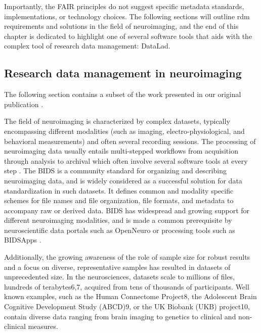 Importantly, the \gls{FAIR} principles do not suggest specific metadata standards, implementations, or technology choices.
The following sections will outline \gls{rdm} requirements and solutions in the field of neuroimaging, and the end of this chapter is dedicated to  highlight one of several software tools that aids with the complex tool of research data management: DataLad.

\subsection{Research data management in neuroimaging}
\label{chap:k1-rdm-2}

The following section contains a subset of the work presented in our original publication \citet{NISO2022119623}.

The field of neuroimaging is characterized by complex datasets, typically encompassing different modalities (such as imaging, electro-physiological, and behavioral measurements) and often several recording sessions.
The processing of neuroimaging data usually entails multi-stepped workflows from acquisition through analysis to archival which often involve several software tools at every step \citep{poline2011}.
The \gls{BIDS} \citep{gorgolewski2016brain} is a community standard for organizing and describing neuroimaging data, and is widely considered as a successful solution for data standardization in such datasets.
It defines common and modality specific schemes for file names and file organization, file formats, and metadata to accompany raw or derived data.
\gls{BIDS} has widespread and growing support for different neuroimaging modalities, and is made a common prerequisite by neuroscientific data portals such as OpenNeuro \citep{markiewicz2021openneuro} or processing tools such as BIDSApps \citep{gorgolewski2017bids}.



Additionally, the growing awareness of the role of sample size for robust results \citep{button2013power} \citep{turner2018small} and a focus on diverse, representative samples has resulted in datasets of unprecedented size.
In the neurosciences, datasets scale to millions of files, hundreds of terabytes6,7, acquired from tens of thousands of participants. Well known examples, such as the Human Connectome Project8, the Adolescent Brain Cognitive Development Study (ABCD)9, or the UK Biobank (UKB) project10, contain diverse data ranging from brain imaging to genetics to clinical and non-clinical measures.

